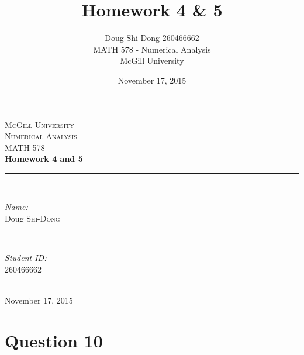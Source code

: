 \documentclass[letterpaper,12pt,]{article}
\title{Homework 4 & 5}
\author{
        Doug Shi-Dong 260466662 \\
        MATH 578 - Numerical Analysis\\
        McGill University
}
\date{November 17, 2015}
\begin{document}
\begin{titlepage}

\newcommand{\HRule}{\rule{\linewidth}{0.5mm}} %

\center %
 


\textsc{\LARGE McGill University}\\[3.5cm]
\textsc{\Large Numerical Analysis}\\[0.5cm] 
\textsc{\large MATH 578}\\[2.5cm]


{ \huge \bfseries Homework 4 and 5}\\[1.5cm] %

\HRule \\[0.4cm]

\begin{minipage}{0.4\textwidth}
\begin{flushleft} \large
\emph{Name:}\\
Doug \textsc{Shi-Dong} %
\end{flushleft}
\end{minipage}
~
\begin{minipage}{0.4\textwidth}
\begin{flushright} \large
\emph{Student ID:} \\
260466662\\
\end{flushright}
\end{minipage}\\[4cm]

\vfill{}
{\large November 17, 2015}\\[2cm]

\end{titlepage}

\section*{Question 10}
\end{document}
